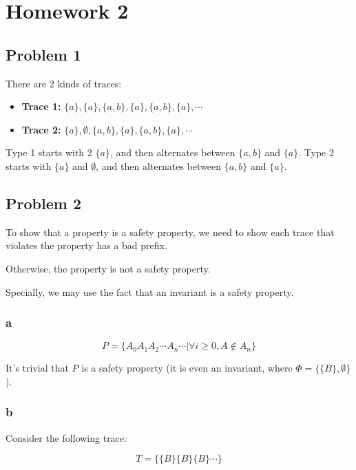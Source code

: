 \chapter{Homework 2}

\section{Problem 1}

There are 2 kinds of traces:

\begin{itemize}
    \item \textbf{Trace 1:} $\{a\}, \{a\}, \{a, b\}, \{a\}, \{a, b\}, \{a\}, \cdots$
    \item \textbf{Trace 2:} $\{a\}, \emptyset, \{a, b\}, \{a\}, \{a, b\}, \{a\}, \cdots$
\end{itemize}

Type 1 starts with 2 $\{a\}$, and then alternates between $\{a, b\}$ and $\{a\}$.
Type 2 starts with $\{a\}$ and $\emptyset$, and then alternates between $\{a, b\}$ and $\{a\}$.

\section{Problem 2}

To show that a property is a safety property, we need to show each trace that violates the property has a bad prefix.

Otherwise, the property is not a safety property.

Specially, we may use the fact that an invariant is a safety property.

\subsection{a}

\newcommand{\A}{\{A\}}
\newcommand{\B}{\{B\}}

$$
P = \{A_0 A_1 A_2 \cdots A_n \cdots | \forall i \ge 0,  A \notin A_n \}
$$

It's trivial that $P$ is a safety property (it is even an invariant, where $\Phi = \{\B, \emptyset \}$).

\subsection{b}

Consider the following trace:

$$
T = \{\B \B \B \cdots \}
$$


